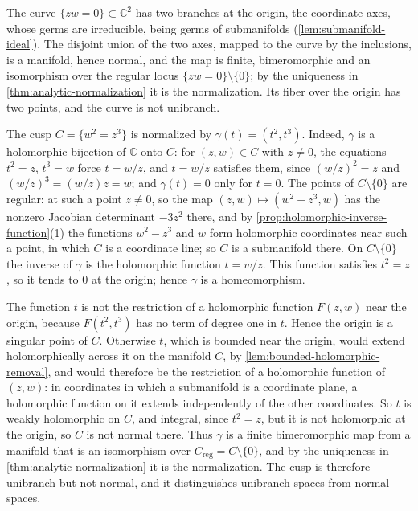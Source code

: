 \begin{example}\label{ex:cusp-node-normalization}
The curve $\{zw=0\}\subset\mathbb C^2$ has two branches at the origin, the coordinate axes, whose germs are irreducible, being germs of submanifolds (\cref{lem:submanifold-ideal}). The disjoint union of the two axes, mapped to the curve by the inclusions, is a manifold, hence normal, and the map is finite, bimeromorphic and an isomorphism over the regular locus $\{zw=0\}\setminus\{0\}$; by the uniqueness in \cref{thm:analytic-normalization} it is the normalization. Its fiber over the origin has two points, and the curve is not unibranch.

The cusp $C=\{w^2=z^3\}$ is normalized by $\gamma(t)=(t^2,t^3)$. Indeed, $\gamma$ is a holomorphic bijection of $\mathbb C$ onto $C$: for $(z,w)\in C$ with $z\neq0$, the equations $t^2=z$, $t^3=w$ force $t=w/z$, and $t=w/z$ satisfies them, since $(w/z)^2=z$ and $(w/z)^3=(w/z)z=w$; and $\gamma(t)=0$ only for $t=0$. The points of $C\setminus\{0\}$ are regular: at such a point $z\neq0$, so the map $(z,w)\mapsto(w^2-z^3,w)$ has the nonzero Jacobian determinant $-3z^2$ there, and by \cref{prop:holomorphic-inverse-function}(1) the functions $w^2-z^3$ and $w$ form holomorphic coordinates near such a point, in which $C$ is a coordinate line; so $C$ is a submanifold there. On $C\setminus\{0\}$ the inverse of $\gamma$ is the holomorphic function $t=w/z$. This function satisfies $t^2=z$, so it tends to $0$ at the origin; hence $\gamma$ is a homeomorphism.

The function $t$ is not the restriction of a holomorphic function $F(z,w)$ near the origin, because $F(t^2,t^3)$ has no term of degree one in $t$. Hence the origin is a singular point of $C$. Otherwise $t$, which is bounded near the origin, would extend holomorphically across it on the manifold $C$, by \cref{lem:bounded-holomorphic-removal}, and would therefore be the restriction of a holomorphic function of $(z,w)$: in coordinates in which a submanifold is a coordinate plane, a holomorphic function on it extends independently of the other coordinates. So $t$ is weakly holomorphic on $C$, and integral, since $t^2=z$, but it is not holomorphic at the origin, so $C$ is not normal there. Thus $\gamma$ is a finite bimeromorphic map from a manifold that is an isomorphism over $C_{\mathrm{reg}}=C\setminus\{0\}$, and by the uniqueness in \cref{thm:analytic-normalization} it is the normalization. The cusp is therefore unibranch but not normal, and it distinguishes unibranch spaces from normal spaces.
\end{example}

